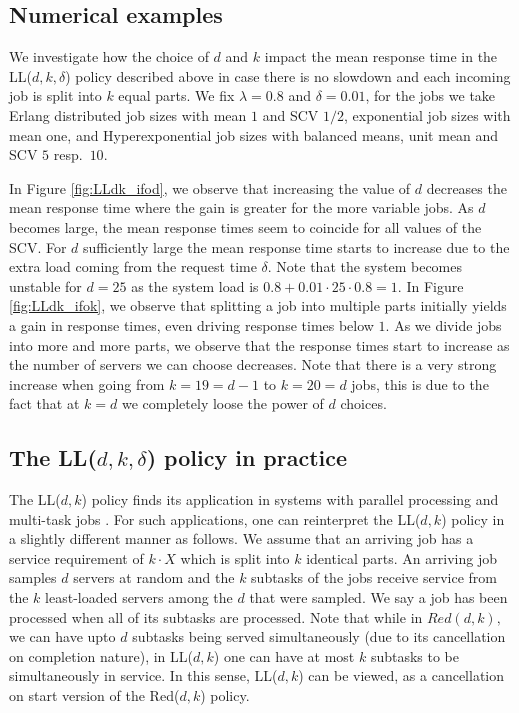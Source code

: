 \documentclass[12pt]{report}
\begin{document}
\subsection*{Numerical examples}
We investigate how the choice of $d$ and $k$ impact the mean response time in the LL($d,k,\delta$) policy described above in case there is no slowdown and each incoming job is split into $k$ equal parts.
We fix $\lambda=0.8$ and $\delta=0.01$, for the jobs we take Erlang distributed job sizes with mean $1$ and SCV $1/2$, exponential job sizes with mean one, and Hyperexponential job sizes with balanced means, unit mean and SCV $5$ resp.~$10$. 

 In Figure \ref{fig:LLdk_ifod}, we observe that increasing the value of $d$ decreases the mean response time where the gain is greater for the more variable jobs. As $d$ becomes large, the mean response times seem to coincide for all values of the SCV. For $d$ sufficiently large the mean response time
 starts to increase due to the extra load coming from the request time $\delta$. Note that the system becomes unstable for $d=25$ as the system load is $0.8+0.01\cdot 25\cdot 0.8=1$. In Figure \ref{fig:LLdk_ifok}, we observe that splitting a job into multiple parts initially yields a gain in response times, even driving response times below $1$. As we divide jobs into more and more parts, we observe that the response times start to increase as the number of servers we can choose decreases. Note that there is a very strong increase when going from $k=19=d-1$ to $k=20=d$ jobs, this is due to the fact that at $k=d$ we completely loose the power of $d$ choices.

\subsection*{The LL($d,k, \delta$) policy in practice}
The LL($d,k$) policy finds its application in systems with parallel processing and multi-task jobs \cite{Wang17}. For such applications, one can reinterpret the LL($d,k$) policy in a slightly different manner as follows. We  assume that an arriving job has a service requirement of $k \cdot X$ which is split into $k$ identical parts. An arriving job samples $d$ servers at random and the $k$ subtasks of the jobs receive service from the  $k$ least-loaded servers among the $d$ that were sampled. We say a job has been processed when all of its subtasks are processed. Note that while in $Red(d,k),$ we can have upto $d$ subtasks being served simultaneously (due to its cancellation on completion nature), in LL($d,k$) one can have at most $k$ subtasks to be simultaneously in service. In this sense, LL($d,k$) can be viewed, as a cancellation on start version of the Red($d,k$) policy.
\end{document}
